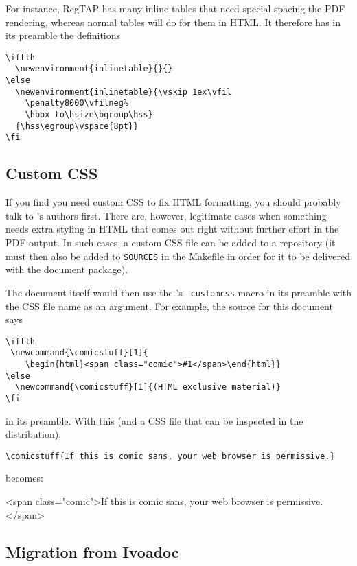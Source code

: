 \documentclass[11pt,a4paper]{ivoa}
\newcommand{\texword}[1]{\texttt{\color{texcolor} #1}}
\newcommand{\comicstuff}[1]{
    \begin{html}<span class="comic">#1</span>\end{html}}
\newcommand{\comicstuff}[1]{(HTML exclusive material)}
\begin{document}
For instance, RegTAP has many inline tables that need special spacing
the PDF rendering, whereas normal tables will do for them
in HTML.  It therefore
has in its preamble the definitions
\begin{lstlisting}
\iftth
  \newenvironment{inlinetable}{}{}
\else
  \newenvironment{inlinetable}{\vskip 1ex\vfil
    \penalty8000\vfilneg%
    \hbox to\hsize\bgroup\hss}
  {\hss\egroup\vspace{8pt}}
\fi
\end{lstlisting}


\subsection{Custom CSS}

If you find you need custom CSS to fix HTML formatting, you should
probably talk to \ivoatex's authors first.  There are, however, 
legitimate cases when something needs extra styling in HTML that 
comes out right without further effort
in the PDF output.  In such cases, a custom CSS file can
be added to a repository (it must then also be added to \texttt{SOURCES}
in the Makefile in order for it to be delivered with the document
package).

The document itself would then use the \ivoatex's \texword{customcss}
macro in its preamble with the CSS file name as an argument.  For
example, the source for this document says

\begin{lstlisting}
\iftth
 \newcommand{\comicstuff}[1]{
    \begin{html}<span class="comic">#1</span>\end{html}}
\else
  \newcommand{\comicstuff}[1]{(HTML exclusive material)}
\fi
\end{lstlisting}

\noindent in its preamble.  With this (and a CSS file that can be inspected in the
distribution),

\begin{lstlisting}
\comicstuff{If this is comic sans, your web browser is permissive.}
\end{lstlisting}

\noindent becomes: 
\comicstuff{If this is comic sans, your web browser is permissive.}

\subsection{Migration from Ivoadoc}
\end{document}
